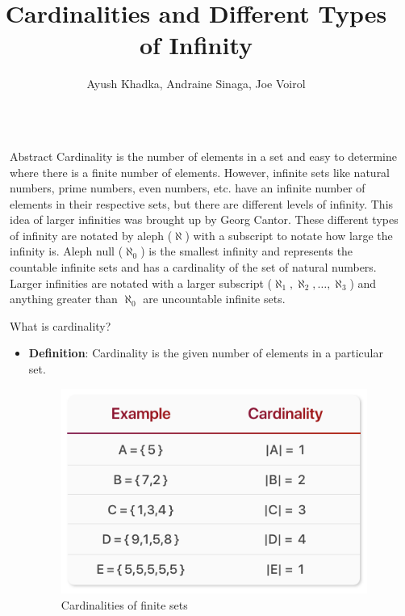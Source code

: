\documentclass[final]{beamer}
\title{Cardinalities and Different Types of Infinity}
\author{Ayush Khadka, Andraine Sinaga, Joe Voirol}
\institute[shortinst]{University of Colorado Boulder}
\newlength{\sepwidth}
\newlength{\colwidth}
\newcommand{\separatorcolumn}{\begin{column}{\sepwidth}\end{column}}
\begin{document}
\begin{frame}[t]
\begin{columns}[t]
\separatorcolumn

\begin{column}{\colwidth}
    \begin{alertblock}{Abstract}
        Cardinality is the number of elements in a set and easy to determine where there is a finite number of elements. However, infinite sets like natural numbers, prime numbers, even numbers, etc. have an infinite number of elements in their respective sets, but there are different levels of infinity. This idea of larger infinities was brought up by Georg Cantor. These different types of infinity are notated by aleph (${\aleph}$) with a subscript to notate how large the infinity is. Aleph null (${\aleph_0}$) is the smallest infinity and represents the countable infinite sets and has a cardinality of the set of natural numbers. Larger infinities are notated with a larger subscript (${\aleph_1}, {\aleph_2} , …, {\aleph_3}$) and anything greater than ${\aleph_0}$ are uncountable infinite sets.
        
    \end{alertblock}

    \begin{block}{What is cardinality?}
    \begin{figure}
      \centering 
    \end{figure}

    \begin{itemize}
        \item \textbf{Definition}: Cardinality is the given number of elements in a particular set.

         \begin{figure}
        \centering
        \includegraphics[width=300mm]{finitecardinality.png}
        \caption{Cardinalities of finite sets}
        \label{fig:enter-label}
        \end{figure}


\end{itemize}
\end{block}
\end{column}
\end{columns}
\end{frame}
\end{document}
